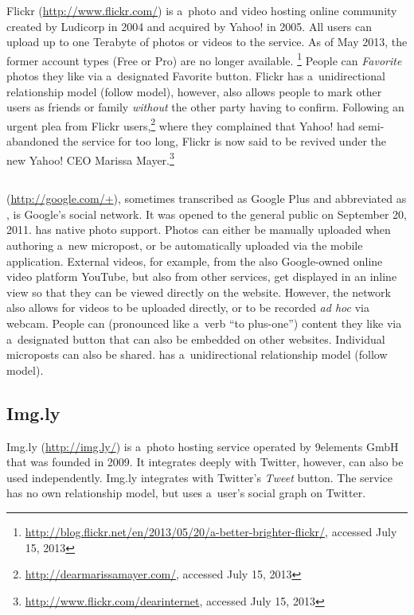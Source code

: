 Flickr (\url{http://www.flickr.com/})
is a~photo and video hosting online community
created by Ludicorp in 2004 and acquired by Yahoo! in 2005.
All users can upload up to one Terabyte of photos or videos
to the service.
As of May 2013, the former account types (Free or Pro)
are no longer available.%
\footnote{\url{http://blog.flickr.net/en/2013/05/20/a-better-brighter-flickr/},
accessed July 15, 2013}
People can \emph{Favorite} photos they like
via a~designated Favorite button.
Flickr has a~unidirectional relationship model (follow model),
however, also allows people to mark other users as friends
or family \emph{without} the other party having to confirm.
Following an urgent plea from Flickr
users,\footnote{\url{http://dearmarissamayer.com/},
accessed July 15, 2013}
where they complained that Yahoo!
had semi-abandoned the service for too long,
Flickr is now said to be revived under the new Yahoo! CEO Marissa
Mayer.\footnote{\url{http://www.flickr.com/dearinternet},
accessed July 15, 2013}

\subsection{\googleplus}

\googleplus (\url{http://google.com/+}),
sometimes transcribed as Google Plus
and abbreviated as \gplus, is Google's social network.
It was opened to the general public on September 20, 2011.
\googleplus has native photo support.
Photos can either be manually uploaded
when authoring a~new micropost,
or be automatically uploaded via the \googleplus
mobile application.
External videos, for example, from
the also Google-owned online video platform YouTube,
but also from other services,
get displayed in an inline view
so that they can be viewed directly on the website.
However, the network also allows for
videos to be uploaded directly,
or to be recorded \emph{ad hoc} via webcam.
People can \emph{\plusone}
(pronounced like a~verb ``to plus-one'') content they like
via a~designated \plusone button
that can also be embedded on other websites.
Individual microposts can also be shared.
\googleplus has a~unidirectional relationship model
(follow model).

\subsection{Img.ly}

Img.ly (\url{http://img.ly/})
is a~photo hosting service operated by 9elements GmbH
that was founded in 2009.
It integrates deeply with Twitter, however,
can also be used independently.
Img.ly integrates with Twitter's \emph{Tweet} button.
The service has no own relationship model,
but uses a~user's social graph on Twitter.

